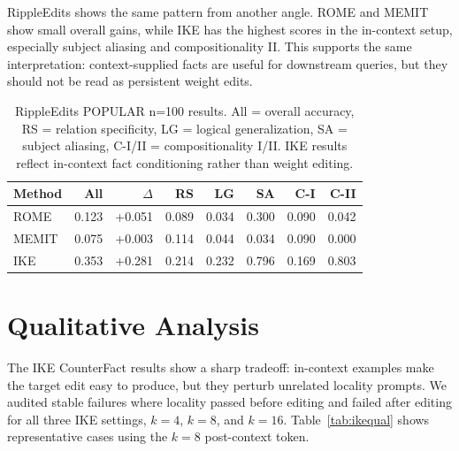 \documentclass[11pt]{article}
\begin{document}
RippleEdits shows the same pattern from another angle. ROME and MEMIT show small overall gains, while IKE has the highest scores in the in-context setup, especially subject aliasing and compositionality II. This supports the same interpretation: context-supplied facts are useful for downstream queries, but they should not be read as persistent weight edits.

\begin{table}[!htbp]
\centering
\scriptsize
\setlength{\tabcolsep}{2.2pt}
\begin{tabular*}{\columnwidth}{@{\extracolsep{\fill}}lrrrrrrr@{}}
\toprule
Method & All & $\Delta$ & RS & LG & SA & C-I & C-II \\
\midrule
ROME & 0.123 & +0.051 & 0.089 & 0.034 & 0.300 & 0.090 & 0.042 \\
MEMIT & 0.075 & +0.003 & 0.114 & 0.044 & 0.034 & 0.090 & 0.000 \\
IKE & 0.353 & +0.281 & 0.214 & 0.232 & 0.796 & 0.169 & 0.803 \\
\bottomrule
\end{tabular*}
\caption{RippleEdits POPULAR n=100 results. All = overall accuracy, RS = relation specificity, LG = logical generalization, SA = subject aliasing, C-I/II = compositionality I/II. IKE results reflect in-context fact conditioning rather than weight editing.}
\label{tab:ripple}
\end{table}

\section{Qualitative Analysis}

The IKE CounterFact results show a sharp tradeoff: in-context examples make the target edit easy to produce, but they perturb unrelated locality prompts. We audited stable failures where locality passed before editing and failed after editing for all three IKE settings, $k=4$, $k=8$, and $k=16$. Table~\ref{tab:ikequal} shows representative cases using the $k=8$ post-context token.
\end{document}
